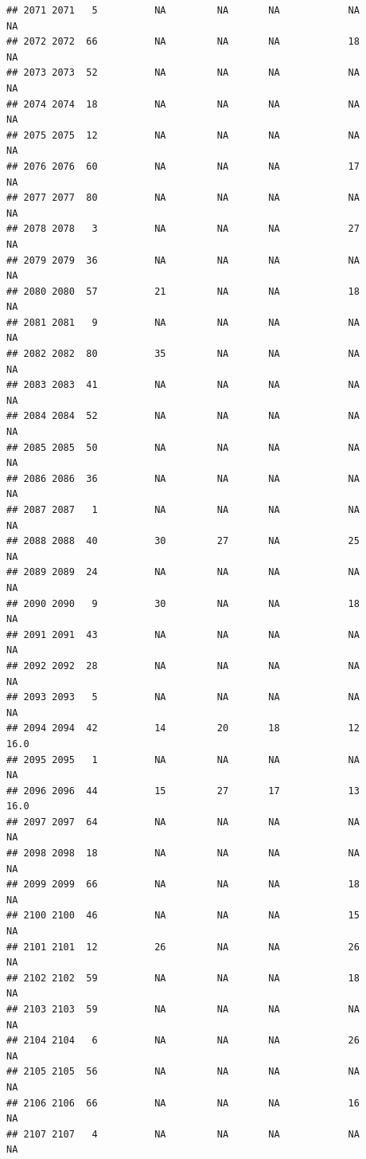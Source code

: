 \documentclass[man]{apa6}
\begin{document}
\begin{verbatim}
## 2071 2071   5          NA         NA       NA            NA       NA
## 2072 2072  66          NA         NA       NA            18       NA
## 2073 2073  52          NA         NA       NA            NA       NA
## 2074 2074  18          NA         NA       NA            NA       NA
## 2075 2075  12          NA         NA       NA            NA       NA
## 2076 2076  60          NA         NA       NA            17       NA
## 2077 2077  80          NA         NA       NA            NA       NA
## 2078 2078   3          NA         NA       NA            27       NA
## 2079 2079  36          NA         NA       NA            NA       NA
## 2080 2080  57          21         NA       NA            18       NA
## 2081 2081   9          NA         NA       NA            NA       NA
## 2082 2082  80          35         NA       NA            NA       NA
## 2083 2083  41          NA         NA       NA            NA       NA
## 2084 2084  52          NA         NA       NA            NA       NA
## 2085 2085  50          NA         NA       NA            NA       NA
## 2086 2086  36          NA         NA       NA            NA       NA
## 2087 2087   1          NA         NA       NA            NA       NA
## 2088 2088  40          30         27       NA            25       NA
## 2089 2089  24          NA         NA       NA            NA       NA
## 2090 2090   9          30         NA       NA            18       NA
## 2091 2091  43          NA         NA       NA            NA       NA
## 2092 2092  28          NA         NA       NA            NA       NA
## 2093 2093   5          NA         NA       NA            NA       NA
## 2094 2094  42          14         20       18            12     16.0
## 2095 2095   1          NA         NA       NA            NA       NA
## 2096 2096  44          15         27       17            13     16.0
## 2097 2097  64          NA         NA       NA            NA       NA
## 2098 2098  18          NA         NA       NA            NA       NA
## 2099 2099  66          NA         NA       NA            18       NA
## 2100 2100  46          NA         NA       NA            15       NA
## 2101 2101  12          26         NA       NA            26       NA
## 2102 2102  59          NA         NA       NA            18       NA
## 2103 2103  59          NA         NA       NA            NA       NA
## 2104 2104   6          NA         NA       NA            26       NA
## 2105 2105  56          NA         NA       NA            NA       NA
## 2106 2106  66          NA         NA       NA            16       NA
## 2107 2107   4          NA         NA       NA            NA       NA

\end{verbatim}
\end{document}
